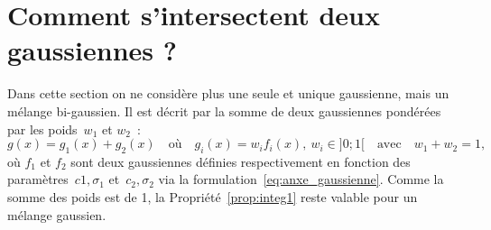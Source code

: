 \documentclass[main.tex]{subfiles}
\begin{document}
\section{Comment s'intersectent deux gaussiennes ?}
Dans cette section on ne considère plus une seule et unique gaussienne, mais un mélange bi-gaussien. Il est décrit par la somme de deux gaussiennes pondérées par les poids~$w_1$ et $w_2$~:
\begin{equation}
\label{eq:anxe_bi_gauss}
g(x)= g_1(x)+ g_2(x) \quad \textrm{où} \quad g_i(x)=w_if_i(x), \ w_i\in ]0;1[  \quad \textrm{avec} \quad w_1 + w_2=1,
\end{equation}
où $f_1$ et $f_2$ sont deux gaussiennes définies respectivement en fonction des paramètres~$c1,\sigma_1$ et~$c_2,\sigma_2$ via la formulation~\eqref{eq:anxe_gaussienne}. Comme la somme des poids est de 1, la Propriété~\ref{prop:integ1} reste valable pour un mélange gaussien.
\end{document}
